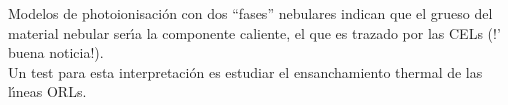 
Modelos de photoionisaci\'on con dos ``fases'' nebulares indican que
el grueso del material nebular ser\'{\i}a la componente caliente, el
que es trazado por las CELs (!' buena noticia!). \\

Un test para esta interpretaci\'on es estudiar el ensanchamiento
thermal de las l\'{\i}neas ORLs. 


